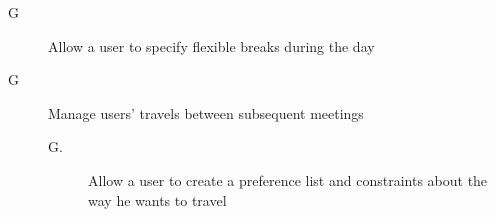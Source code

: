 \begin{description}
\setcounter{countin}{1}

\item[G\thecount] Allow a user to specify flexible breaks during the day

\setcounter{countin}{1}

\item[G\thecount] Manage users’ travels between subsequent meetings
\begin{description}
\item[G\thecount.\thecountin] Allow a user to create a preference list and constraints about the way he wants to travel
\end{description}
\end{description}


